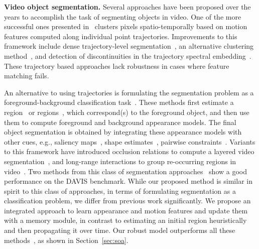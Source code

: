 \documentclass[10pt,twocolumn,letterpaper]{article}
\begin{document}
\noindent \textbf{Video object segmentation.}
Several approaches have been proposed over the years to accomplish the task of
segmenting objects in video. One of the more successful ones presented
in~\cite{brox2010object} clusters pixels spatio-temporally based on motion
features computed along individual point trajectories. Improvements to this
framework include dense trajectory-level segmentation~\cite{ochs2011object}, an
alternative clustering method~\cite{keuper2015motion}, and detection of
discontinuities in the trajectory spectral
embedding~\cite{fragkiadaki2012video}. These trajectory based approaches lack
robustness in cases where feature matching fails.

An alternative to using trajectories is formulating the segmentation problem as
a foreground-background classification
task~\cite{papazoglou2013fast,lee2011key,wang2015saliency}. These methods first
estimate a region~\cite{papazoglou2013fast,wang2015saliency} or
regions~\cite{lee2011key}, which correspond(s) to the foreground object, and
then use them to compute foreground and background appearance models. The final
object segmentation is obtained by integrating these appearance models with
other cues, e.g., saliency maps~\cite{wang2015saliency}, shape
estimates~\cite{lee2011key}, pairwise constraints~\cite{papazoglou2013fast}.
Variants to this framework have introduced occlusion relations to compute a
layered video segmentation~\cite{taylor2015causal}, and long-range interactions
to group re-occurring regions in video~\cite{Faktor14}. Two methods from this
class of segmentation approaches~\cite{papazoglou2013fast,Faktor14} show a good
performance on the DAVIS benchmark. While our proposed method is similar in
spirit to this class of approaches, in terms of formulating segmentation as a
classification problem, we differ from previous work significantly. We propose
an integrated approach to learn appearance and motion features and update them
with a memory module, in contrast to estimating an initial region heuristically
and then propagating it over time. Our robust model outperforms all these
methods~\cite{papazoglou2013fast,wang2015saliency,lee2011key,taylor2015causal,Faktor14},
as shown in Section~\ref{sec:soa}.
\end{document}
